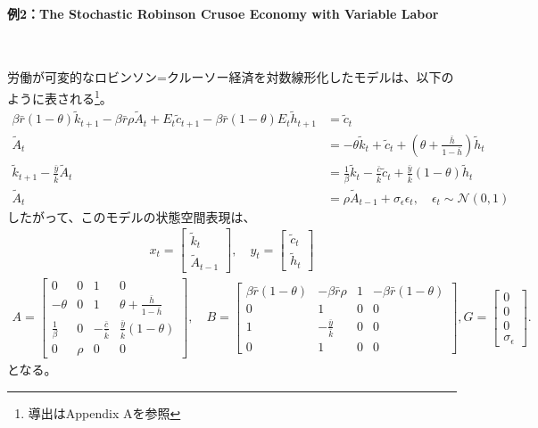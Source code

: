 \documentclass[a4j, dvipdfmx]{jarticle}
\begin{document}
\paragraph{例2：The Stochastic Robinson Crusoe Economy with Variable Labor}~

労働が可変的なロビンソン=クルーソー経済を対数線形化したモデルは、以下のように表される\footnote{導出はAppendix Aを参照}。
\begin{align}
\beta\bar r (1-\theta)\tilde k_{t+1} -\beta\bar r\rho\tilde A_t + E_t\tilde c_{t+1}-\beta\bar r (1-\theta)E_t\tilde h_{t+1} &= \tilde c_t \label{euler2}\\
\tilde A_t & =  - \theta\tilde k_t + \tilde c_t + \left(\theta+ \frac{\bar h}{1-\bar h}\right)\tilde h_t \\
\tilde k_{t+1} - \frac{\bar y}{\bar k} \tilde A_t &= \frac{1}{\beta}\tilde k_t - \frac{\bar c}{\bar k} \tilde c_t + \frac{\bar y}{\bar k} (1-\theta) \tilde h_t\\
\tilde A_t &= \rho \tilde A_{t-1} + \sigma_{\epsilon} \epsilon_t, \quad \epsilon_t \sim \mathcal N(0,1)
\end{align}
したがって、このモデルの状態空間表現は、
\begin{align}
x_t = \begin{bmatrix}\tilde k_t \\ \tilde A_{t-1}\end{bmatrix}, \quad y_t = \begin{bmatrix}\tilde c_t \\ \tilde h_t\end{bmatrix}
\end{align}
\begin{align}
A = \begin{bmatrix}0 & 0 & 1 & 0 \\ -\theta & 0 & 1 & \theta+\frac{\bar h}{1-\bar h} \\ \frac{1}{\beta} & 0 & -\frac{\bar c}{\bar k} & \frac{\bar y}{\bar k}(1-\theta) \\ 0 & \rho & 0 & 0\end{bmatrix}, \quad B=\begin{bmatrix}\beta \bar r (1-\theta) & -\beta \bar r \rho & 1 & -\beta \bar r (1-\theta) \\ 0 & 1 & 0 & 0 \\ 1 & -\frac{\bar y}{\bar k} & 0 & 0 \\ 0 & 1 & 0 & 0\end{bmatrix}, G=\begin{bmatrix}0 \\ 0 \\ 0 \\ \sigma_{\epsilon}\end{bmatrix}.
\end{align}
となる。
\end{document}
